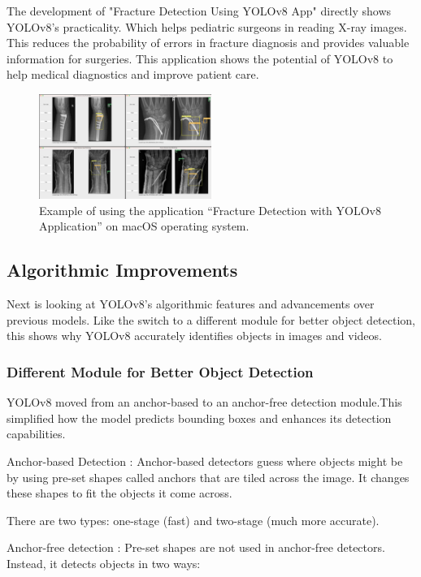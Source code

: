 \documentclass[11pt,journal,compsoc]{IEEEtran}
\begin{document}
The development of "Fracture Detection Using YOLOv8 App"\cite{ju2023fracture} directly shows YOLOv8's practicality. Which helps pediatric surgeons in reading X-ray images. This reduces the probability of errors in fracture diagnosis and provides valuable information for surgeries. This application shows the potential of YOLOv8 to help medical diagnostics and improve patient care.

\begin{figure}[ht]
  \centering
  \includegraphics[width=0.5\textwidth]{images/FractureImple.png} 
  \caption{Example of using the application “Fracture Detection with YOLOv8 Application” on macOS
operating system. \cite{ju2023fracture}}
  \label{fig:Fracture example}
\end{figure}


\subsection{Algorithmic Improvements}
Next is looking at YOLOv8's algorithmic features and advancements over previous models. Like the switch to a different module for better object detection, this shows why YOLOv8  accurately identifies objects in images and videos.

\subsubsection{Different Module for Better Object Detection}
YOLOv8 moved from an anchor-based to an anchor-free detection module\cite{yolov8mmyolo2023}.This simplified how the model predicts bounding boxes and enhances its detection capabilities.

Anchor-based Detection \cite{MathWorksAnchorBoxes} :
Anchor-based detectors guess where objects might be by using pre-set shapes called anchors that are tiled across the image. It changes these shapes to fit the objects it come across.

There are two types: one-stage (fast) and two-stage (much more accurate).

Anchor-free detection \cite{LearnOpenCVCenterNet} :
Pre-set shapes are not used in anchor-free detectors. Instead, it detects objects in two ways:
\end{document}
